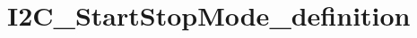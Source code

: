 \hypertarget{group___i2_c___start_stop_mode__definition}{\section{I2\-C\-\_\-\-Start\-Stop\-Mode\-\_\-definition}
\label{group___i2_c___start_stop_mode__definition}
}
